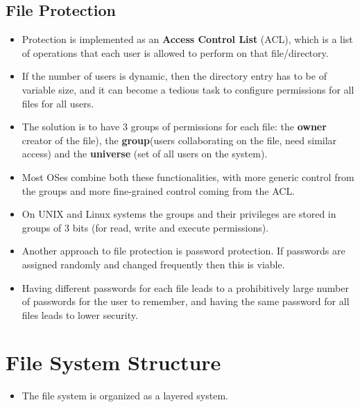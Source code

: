 \documentclass{article}
\theoremstyle{plain}
\theoremstyle{definition}
\begin{document}
\subsection{File Protection}
\begin{itemize}
    \item Protection is implemented as an \textbf{Access Control List} (ACL), which is a list of operations that each user is allowed to perform on that file/directory.
    
    \item If the number of users is dynamic, then the directory entry has to be of variable size, and it can become a tedious task to configure permissions for all files for all users. 
    
    \item The solution is to have 3 groups of permissions for each file: the \textbf{owner} creator of the file), the \textbf{group}(users collaborating on the file, need similar access) and the \textbf{universe} (set of all users on the system).
    
    \item Most OSes combine both these functionalities, with more generic control from the groups and more fine-grained control coming from the ACL. 
    
    \item On UNIX and Linux systems the groups and their privileges are stored in groups of 3 bits (for read, write and execute permissions).
    
    \item Another approach to file protection is password protection. If passwords are assigned randomly and changed frequently then this is viable.
    
    \item Having different passwords for each file leads to a prohibitively large number of passwords for the user to remember, and having the same password for all files leads to lower security. 
\end{itemize}

\section{File System Structure}
\begin{itemize}
    \item The file system is organized as a layered system. 
\end{itemize}
\end{document}

